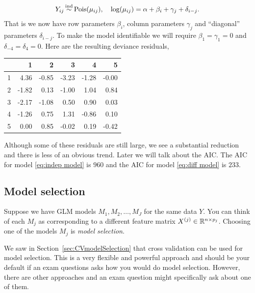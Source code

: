 \begin{example}
        \begin{equation}Y_{ij} \simind \mathrm{Pois}(\mu_{ij}), \quad \log(\mu_{ij}) = \alpha + \beta_i + \gamma_j + \delta_{i-j}.  \label{eq:diff model}\end{equation}
        That is we now have row parameters $\beta_i$, column parameters $\gamma_j$ and ``diagonal'' parameters $\delta_{i-j}$. To make the model identifiable we  will require $\beta_1 =\gamma_1 = 0$ and $\delta_{-4}=\delta_{4}= 0$. Here are the resulting deviance residuals,
        \begin{table}[ht]
            \centering
            \begin{tabular}{|r|rrrrr|}
              \hline
             & 1 & 2 & 3 & 4 & 5 \\ 
              \hline
            1 & 4.36 & -0.85 & -3.23 & -1.28 & -0.00 \\ 
              2 & -1.82 & 0.13 & -1.00 & 1.04 & 0.84 \\ 
              3 & -2.17 & -1.08 & 0.50 & 0.90 & 0.03 \\ 
              4 & -1.26 & 0.75 & 1.31 & -0.86 & 0.10 \\ 
              5 & 0.00 & 0.85 & -0.02 & 0.19 & -0.42 \\ 
               \hline
            \end{tabular}
            \end{table}
        Although some of these residuals are still large, we see a substantial reduction and there is less of an obvious trend. Later we will talk about the AIC. The AIC for model \eqref{eq:indep model} is $960$ and the AIC for model \eqref{eq:diff model} is $233$. 
\end{example}

\subsection{Model selection}

Suppose we have GLM models $M_1,M_2,\ldots,M_J$ for the same data $Y$. You can think of each $M_j$ as corresponding to a different feature matrix $X^{(j)} \in \mathbb{R}^{n \times p_j}$. Choosing one of the models $M_j$ is \emph{model selection}. 


We saw in Section~\ref{sec:CVmodelSelection} that cross validation can be used for model selection. This is a very flexible and powerful approach and should be your default if an exam questions asks how you would do model selection. However, there are other approaches and an exam question might specifically ask about one of them.



